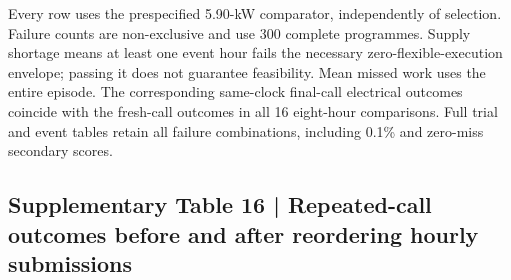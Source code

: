 \documentclass[10pt,a4paper]{article}
\begin{document}
Every row uses the prespecified 5.90-kW comparator, independently of selection. Failure counts are non-exclusive and use 300 complete programmes. Supply shortage means at least one event hour fails the necessary zero-flexible-execution envelope; passing it does not guarantee feasibility. Mean missed work uses the entire episode. The corresponding same-clock final-call electrical outcomes coincide with the fresh-call outcomes in all 16 eight-hour comparisons. Full trial and event tables retain all failure combinations, including 0.1\% and zero-miss secondary scores.


\pagebreak[2]
\subsection{Supplementary Table 16 | Repeated-call outcomes before and after reordering hourly submissions}
\end{document}
